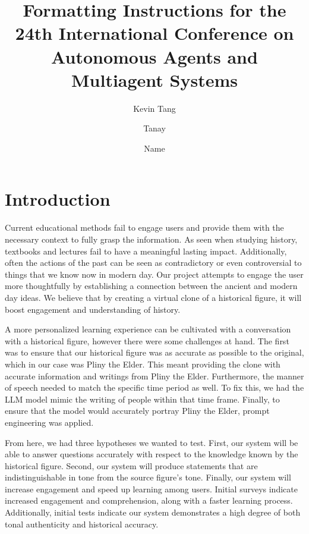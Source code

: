 \documentclass[sigconf]{aamas}
\title[AAMAS-2025 Formatting Instructions]{Formatting Instructions for the 24th International Conference on Autonomous Agents and Multiagent Systems}
\author{Kevin Tang}
\affiliation{
  \institution{Northeastern University}
  \city{Boston}
  \country{United States}}
\author{Tanay}
\affiliation{
  \institution{Northeastern University}
  \city{Boston}
  \country{United States}}
\author{Name}
\affiliation{
  \institution{The Lady's Lake}
  \city{Avalon}
  \country{United Kingdom}}
\begin{document}

\pagestyle{fancy}
\fancyhead{}


\maketitle 


\section{Introduction}

Current educational methods fail to engage users and provide them with the necessary context to fully grasp the information. As seen when studying history, textbooks and lectures fail to have a meaningful lasting impact. Additionally, often the actions of the past can be seen as contradictory or even controversial to things that we know now in modern day. Our project attempts to engage the user more thoughtfully by establishing a connection between the ancient and modern day ideas. We believe that by creating a virtual clone of a historical figure, it will boost engagement and understanding of history.

A more personalized learning experience can be cultivated with a conversation with a historical figure, however there were some challenges at hand. The first was to ensure that our historical figure was as accurate as possible to the original, which in our case was Pliny the Elder. This meant providing the clone with accurate information and writings from Pliny the Elder. Furthermore, the manner of speech needed to match the specific time period as well. To fix this, we had the LLM model mimic the writing of people within that time frame. Finally, to ensure that the model would accurately portray Pliny the Elder, prompt engineering was applied.

From here, we had three hypotheses we wanted to test. First, our system will be able to answer questions accurately with respect to the knowledge known by the historical figure. Second, our system will produce statements that are indistinguishable in tone from the source figure’s tone. Finally, our system will increase engagement and speed up learning among users. Initial surveys indicate increased engagement and comprehension, along with a faster learning process. Additionally, initial tests indicate our system demonstrates a high degree of both tonal authenticity and historical accuracy.
\end{document}
